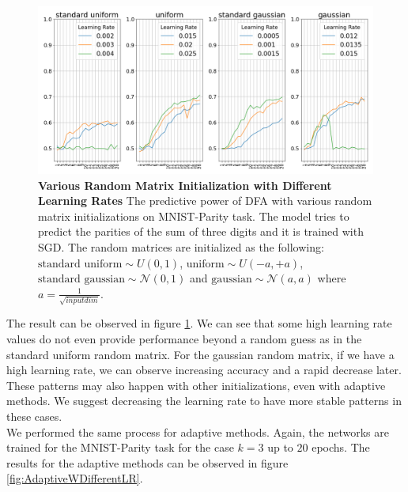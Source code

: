 \documentclass[a4paper, nobind]{templates/ociamthesis}
\begin{document}
\begin{figure}

{\centering \includegraphics[width=1\linewidth]{figures/B_k3_SGD_DFA_BInitsWDifferentlrs} 

}

\caption[Various Random Matrix Initialization with Different Learning Rates]{\textbf{Various Random Matrix Initialization with Different Learning Rates} \newline The predictive power of DFA with various random matrix initializations on MNIST-Parity task. The model tries to predict the parities of the sum of three digits and it is trained with SGD. The random matrices are initialized as the following: $\text{standard uniform} \sim U(0,1)$, $\text{uniform} \sim U(-a,+a)$, $\text{standard gaussian} \sim \mathcal{N}\left(0, 1\right)$ and $\text{gaussian} \sim \mathcal{N}\left(a, a \right)$ where $a= \frac{1}{\sqrt{input dim}}$.}\label{fig:BinitWDifferentLR}
\end{figure}

\noindent The result can be observed in figure \ref{fig:BinitWDifferentLR}. We can see that some high learning rate values do not even provide performance beyond a random guess as in the standard uniform random matrix. For the gaussian random matrix, if we have a high learning rate, we can observe increasing accuracy and a rapid decrease later. These patterns may also happen with other initializations, even with adaptive methods. We suggest decreasing the learning rate to have more stable patterns in these cases.\\
We performed the same process for adaptive methods. Again, the networks are trained for the MNIST-Parity task for the case \(k=3\) up to \(20\) epochs. The results for the adaptive methods can be observed in figure \ref{fig:AdaptiveWDifferentLR}.
\end{document}
